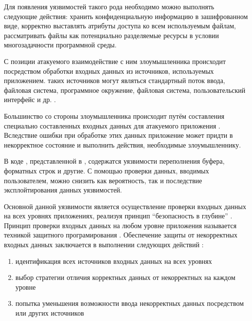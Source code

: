 %
Для  появления уязвимостей такого рода необходимо можно выполнять следующие действия: хранить конфиденциальную информацию в зашифрованном виде, корректно выставлять атрибуты доступа ко всем используемым файлам, рассматривать файлы как потенциально разделяемые ресурсы в условии многозадачности программной среды.



%
С позиции атакуемого  взаимодействие с ним злоумышленника происходит посредством обработки входных данных из источников, используемых приложением. 
%
 таких источников могут являться стандартный поток ввода, файловая система, программное окружение, файловая система, пользовательский интерфейс и др.  . 

%
Большинство  со стороны злоумышленника происходит путём составления специально составленных входных данных для атакуемого приложения . 
%
Вследствие ошибки при обработке этих данных приложение может придти в некорректное состояние и выполнить действия, необходимые злоумышленнику. 

%
В коде , представленной в , содержатся уязвимости переполнения буфера, форматных строк и другие. 
%
С помощью проверки данных, вводимых пользователем, можно снизить как вероятность, так и последствие эксплойтирования данных уязвимостей. 

%
Основной  данной уязвимости является осуществление проверки входных данных на всех уровнях приложениях, реализуя принцип “безопасность в глубине” . 
%
Принцип проверки входных данных на любом уровне приложения называется техникой защитного програмирования . 
%
Обеспечение защиты от некорректных входных данных заключается в выполнении следующих действий 
: 
\begin{enumerate}

	\item идентификация всех источников входных данных на всех уровнях 

	\item выбор стратегии отличия корректных данных от некорректных на каждом уровне 

	\item попытка уменьшения возможности ввода некорректных данных посредством  или других источников
\end{enumerate}

